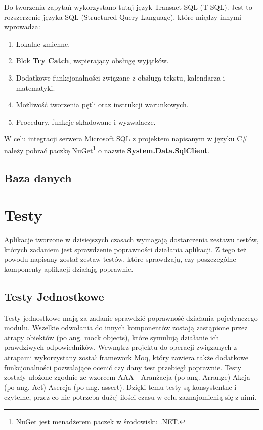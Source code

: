 Do tworzenia zapytań wykorzystano tutaj język Transact-SQL (T-SQL). Jest to rozszerzenie języka SQL (Structured Query Language), które między innymi wprowadza:

\begin{enumerate}
	\item Lokalne zmienne.
	\item Blok \textbf{Try Catch}, wspierający obsługę wyjątków.
	\item Dodatkowe funkcjonalności związane z obsługą tekstu, kalendarza i matematyki.
	\item Możliwość tworzenia pętli oraz instrukcji warunkowych.
	\item Procedury, funkcje składowane i wyzwalacze.
\end{enumerate} 

W celu integracji serwera Microsoft SQL z projektem napisanym w języku C\# należy pobrać paczkę NuGet\footnote{NuGet jest menadżerem paczek w środowisku .NET.\cite{Nuget}} o nazwie \textbf{System.Data.SqlClient}.

\section{Baza danych}






\newpage
{\let\cleardoublepage\relax \chapter{Testy}}


Aplikacje tworzone w dzisiejszych czasach wymagają dostarczenia zestawu testów, których zadaniem jest sprawdzenie poprawności działania aplikacji. Z tego też powodu napisany został zestaw testów, które sprawdzają, czy poszczególne komponenty aplikacji działają poprawnie.

\section{Testy Jednostkowe}

Testy jednostkowe mają za zadanie sprawdzić poprawność działania pojedynczego modułu. Wszelkie odwołania do innych komponentów zostają zastąpione przez atrapy obiektów (po ang. mock objects), które symulują działanie ich prawdziwych odpowiedników.
 Wewnątrz projektu do operacji związanych z atrapami wykorzystany został framework Moq, który zawiera także dodatkowe funkcjonalności pozwalające ocenić czy dany test przebiegł poprawnie.
Testy zostały ułożone zgodnie ze wzorcem AAA\cite{UnitTestingMicrosoft} - Aranżacja (po ang. Arrange) Akcja (po ang. Act) Asercja (po ang. assert).  Dzięki temu testy są konsystentne i czytelne, przez co nie potrzeba dużej ilości czasu w celu zaznajomienią się z nimi.

